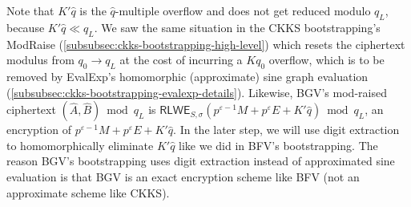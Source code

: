 \begin{enumerate}
$ $

Note that $K'\hat{q}$ is the $\hat{q}$-multiple overflow and does not get reduced modulo $q_L$, because $K'\hat{q} \ll q_L$. We saw the same situation in the CKKS bootstrapping's \textsf{ModRaise} (\autoref{subsubsec:ckks-bootstrapping-high-level}) which resets the ciphertext modulus from $q_0 \rightarrow q_L$ at the cost of incurring a $Kq_0$ overflow, which is to be removed by \textsf{EvalExp}'s homomorphic (approximate) sine graph evaluation (\autoref{subsubsec:ckks-bootstrapping-evalexp-details}). Likewise, BGV's mod-raised ciphertext $(\hat{A}, \hat{B}) \bmod q_L$ is $\textsf{RLWE}_{S, \sigma}(p^{\varepsilon-1}M + p^\varepsilon E + K'\hat{q}) \bmod q_L$, an encryption of $p^{\varepsilon-1}M + p^\varepsilon E + K'\hat{q}$. In the later step, we will use digit extraction to homomorphically eliminate $K'\hat{q}$ like we did in BFV's bootstrapping. The reason BGV's bootstrapping uses digit extraction instead of approximated sine evaluation is that BGV is an exact encryption scheme like BFV (not an approximate scheme like CKKS). 










\end{enumerate}
